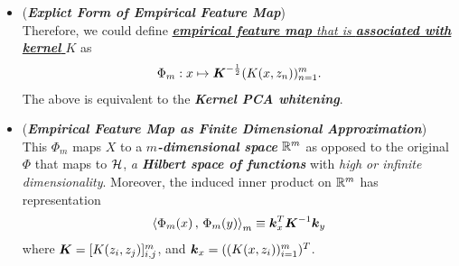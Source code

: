 \documentclass[11pt]{article}
\begin{document}
\begin{itemize}
\item 
\begin{remark} (\emph{\textbf{Explict Form of Empirical Feature Map}}) \citep{scholkopf2001learning}\\
Therefore, we could define \underline{\emph{\textbf{empirical feature map} that is \textbf{associated with kernel} $K$}} as
\begin{align*}
\Phi_{m}: x  \mapsto \boldsymbol{K}^{-\frac{1}{2}}(K(x, z_{n}) )_{n=1}^{m}.
\end{align*} The above is equivalent to the \emph{\textbf{Kernel PCA whitening}}.
\end{remark}

\item \begin{remark} (\emph{\textbf{Empirical Feature Map as Finite Dimensional Approximation}})\\
This $\Phi_{m}$ maps $X$ to a \emph{\textbf{$m$-dimensional space}} ${\mathbb R}^{m}$ as opposed to the original $\Phi$ that maps to ${\mathcal H}$, \emph{a \textbf{Hilbert space of functions}} with \emph{high or infinite dimensionality}. Moreover, the induced inner product on ${\mathbb R}^{m}$ has representation
\begin{align*}
\left\langle \Phi_{m}(x)\,,\, \Phi_{m}(y) \right\rangle_{m}\equiv \boldsymbol{k}_{x}^{T}\boldsymbol{K}^{-1}\boldsymbol{k}_{y}
\end{align*}
where $\boldsymbol{K} = [K(z_{i}, z_{j})]_{i,j}^{m}$, and $\boldsymbol{k}_{x}= ((K( x, z_{i}) )_{i=1}^{m})^{T}$.
\end{remark}

\end{itemize}
\end{document}
